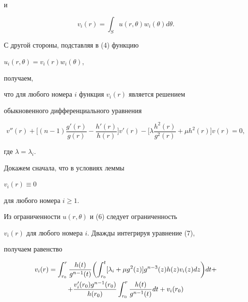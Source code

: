 \begin{pf}
и


%


\begin{equation}


v_{i}(r) = \int_{S}u(r,\theta)w_{i}(\theta) d \theta.


\end{equation}





С другой стороны, подставляя в (4) функцию


$u_i(r,\theta) = v_i(r)w_i(\theta)$,


получаем,


что для любого номера $i$ функция $v_i(r)$ является решением


обыкновенного дифференциального уравнения


%


\begin{equation}


v''(r) + \biggl[(n-1)\frac{g'(r)}{g(r)} - \frac{h'(r)}{h(r)} \biggr]


v'(r) - \biggl[\lambda \frac{h^2(r)}{g^2(r)} +\mu h^2(r)\biggr]v(r) = 0 ,


\end{equation}


%


где $\lambda = \lambda_i$.





Докажем сначала, что в условиях леммы


$v_i(r) \equiv 0 $


для любого номера $i \ge 1$.


Из ограниченности $u(r,\theta)$ и (6) следует ограниченность


$v_i(r)$ для любого номера $i$. Дважды интегрируя уравнение (7),


получаем равенство


\begin{gather}


v_i(r)=\int_{r_0}^{r}\frac{h(t)}{g^{n-1}(t)} \biggl(


\int_{r_0}^{t}[\lambda_i + \mu g^2(z)]g^{n-3}(z)


h(z)v_i(z)dz \biggr)dt +\notag \\


%


+\frac{v'_i(r_0)g^{n-1}(r_0)}{h(r_0)}\int_{r_0}^{r}\frac{h(t)}{g^{n-1}


(t)}dt + v_i(r_0)



\end{gather}
\end{pf}
